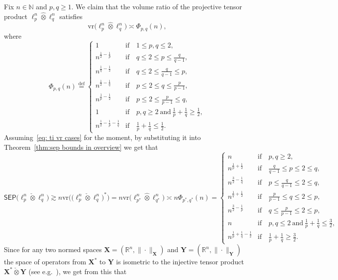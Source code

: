 \documentclass[11pt,reqno]{amsart}
\renewcommand{\le}{\leqslant}
\renewcommand{\ge}{\geqslant}
\newcommand{\vr}{\mathrm{vr}}
\newcommand{\X}{\mathbf X}
\newcommand{\Y}{\mathbf Y}
\newcommand{\R}{\mathbb R}
\theoremstyle{remark}
\newcommand{\N}{\mathbb N}
\newcommand{\eqdef}{\stackrel{\mathrm{def}}{=}}
\renewcommand{\1}{\mathbf 1}
\newcommand{\sep}{\mathsf{SEP}}
\newcommand{\tp}{\hat{\otimes}}
\newcommand{\ti}{\check{\otimes}}
\begin{document}
Fix $n\in \N$ and $p,q\ge 1$. We claim that  the volume ratio of the projective tensor product $\ell_p^n\tp \ell_q^n$ satisfies
\begin{equation}\label{eq:vr of ti pq}
\vr\big(\ell_p^n\tp \ell_q^n\big)\asymp \Phi_{p,q}(n),
\end{equation}
where
\begin{equation}\label{eq: ti vr cases}
\Phi_{p,q}(n)\eqdef \left\{\begin{array}{ll}1 &\mathrm{if}\quad 1\le p,q\le 2,\\
n^{\frac12-\frac{1}{p}}&\mathrm{if}\quad q\le 2\le p\le \frac{q}{q-1},\\
n^{\frac1{q}-\frac{1}{2}}&\mathrm{if}\quad q\le 2\le \frac{q}{q-1}\le p,\\
n^{\frac12-\frac{1}{q}}&\mathrm{if}\quad p\le 2\le q\le \frac{p}{p-1},\\
n^{\frac1{p}-\frac{1}{2}}&\mathrm{if}\quad p\le 2\le \frac{p}{p-1}\le q,\\
1 &\mathrm{if}\quad p,q\ge 2\ \mathrm{and}\  \frac{1}{p}+\frac{1}{q}\ge \frac12,\\
n^{\frac12-\frac{1}{p}-\frac{1}{q}}&\mathrm{if}\quad \frac{1}{p}+\frac{1}{q}\le \frac12.
\end{array}\right.
\end{equation}
Assuming~\eqref{eq: ti vr cases} for the moment,  by substituting it into Theorem~\ref{thm:sep bounds in overview} we get that
$$
\sep\big(\ell_p^n\ti \ell_q^n\big)\gtrsim n\vr\big(\big(\ell_{p}^n\ti \ell_{q}^n\big)^*\big)=n\vr\big(\ell_{\!\! p^*}^n\tp \ell_{\!\! q^*}^n\big)\asymp n\Phi_{p^*,q^*}(n)= \left\{\begin{array}{ll}n &\mathrm{if}\quad p,q\ge 2,\\
n^{\frac{1}{p}+\frac12}&\mathrm{if}\quad \frac{q}{q-1}\le p\le 2\le q,\\
n^{\frac32-\frac1{q}}&\mathrm{if}\quad p\le \frac{q}{q-1}\le 2\le q,\\
n^{\frac{1}{q}+\frac12}&\mathrm{if}\quad \frac{p}{p-1}\le q\le 2\le p,\\
n^{\frac32-\frac1{p}}&\mathrm{if}\quad q\le \frac{p}{p-1}\le 2\le p,\\
n &\mathrm{if}\quad p,q\le 2\ \mathrm{and}\  \frac{1}{p}+\frac{1}{q}\le \frac32,\\
n^{\frac{1}{p}+\frac{1}{q}-\frac12}&\mathrm{if}\quad \frac{1}{p}+\frac{1}{q}\ge \frac32.
\end{array}\right.
$$
Since for any two normed spaces $\X=(\R^n,\|\cdot\|_\X)$ and $\Y=(\R^n,\|\cdot\|_\Y)$ the space of operators from $\X^*$ to $\Y$ is isometric to the injective tensor product $\X^*\ti \Y$ (see e.g.~\cite{DFS08}), we get from this that
\end{document}

